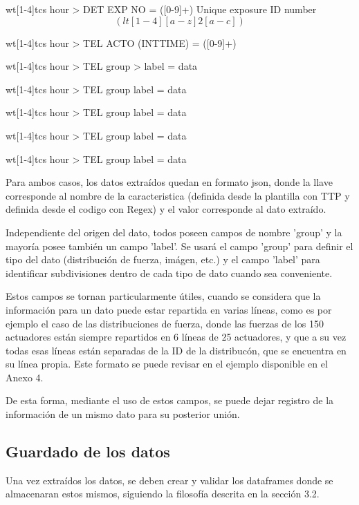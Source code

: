 \begin{enumerate}
\begin{myverbatim}[caption={Plantillas TTP},label={myverbatim:ttp}]
wt[1-4]tcs {{ hour }}> DET EXP NO = ([0-9]+) \/ Unique 
exposure ID number \[(lt[1-4][a-z]{2}[a-c])\]

wt[1-4]tcs {{ hour }}> TEL ACTO (INTTIME) = ([0-9]+)

wt[1-4]tcs {{ hour }}> TEL {{ group }} >{{ label }} = 
{{ data }}

wt[1-4]tcs {{ hour }}> TEL {{ group }} {{ label }} = 
{{ data }}

wt[1-4]tcs {{ hour }}> TEL {{ group }}{{ label }}= 
{{ data }}

wt[1-4]tcs {{ hour }}> TEL {{ group }}{{ label }}= 
{{ data }}

wt[1-4]tcs {{ hour }}> TEL {{ group }} {{ label }} = 
{{ data }}
    
    \end{myverbatim}

\end{enumerate}

Para ambos casos, los datos extraídos quedan en formato json, donde la llave corresponde al nombre de la caracteristica (definida desde la plantilla con TTP y definida desde el codigo con Regex) y el valor corresponde al dato extraído.

Independiente del origen del dato, todos poseen campos de nombre 'group' y la mayoría posee también un campo 'label'. Se usará el campo 'group' para definir el tipo del dato (distribución de fuerza, imágen, etc.) y el campo 'label' para identificar subdivisiones dentro de cada tipo de dato cuando sea conveniente.

Estos campos se tornan particularmente útiles, cuando se considera que la información para un dato puede estar repartida en varias líneas, como es por ejemplo el caso de las distribuciones de fuerza, donde las fuerzas de los 150 actuadores están siempre repartidos en 6 líneas de 25 actuadores, y que a su vez todas esas líneas están separadas de la ID de la distribucón, que se encuentra en su línea propia. Este formato se puede revisar en el ejemplo disponible en el Anexo 4.

De esta forma, mediante el uso de estos campos, se puede dejar registro de la información de un mismo dato para su posterior unión.

\subsection{Guardado de los datos}

Una vez extraídos los datos, se deben crear y validar los dataframes donde se almacenaran estos mismos, siguiendo la filosofía descrita en la sección 3.2.

